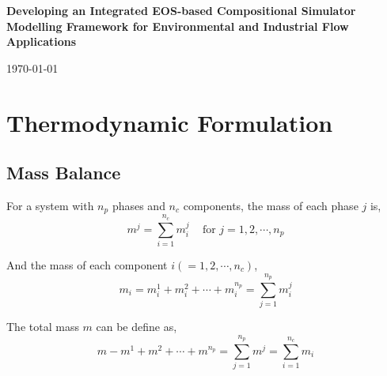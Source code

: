 \documentclass[12pts,a4paper,amsmath,amssymb,floatfix]{article}%
\newcommand{\summation}{\sum\limits}
\begin{document}
\begin{center}
{\Large {\bf Developing an Integrated EOS-based Compositional Simulator Modelling Framework for Environmental and Industrial Flow Applications}}
\end{center}
\begin{flushright}
\today
\end{flushright}

\section{Thermodynamic Formulation}
 
\subsection{Mass Balance}
For a system with $n_{p}$ phases and $n_{c}$ components, the mass of each phase $j$ is,
\begin{equation}
m^{j} = \summation_{i=1}^{n_{c}}m_{i}^{j}\;\;\;\text{ for }j=1,2,\cdots,n_{p}
\label{Eqn_MassBalance_Phase}
\end{equation}

And the mass of each component $i\left(=1,2,\cdots,n_{c}\right)$,
\begin{equation}
m_{i} = m_{i}^{1} + m_{i}^{2} + \cdots + m_{i}^{n_{p}} = \summation_{j=1}^{n_{p}}m_{i}^{j}
\label{Eqn_MassBalance_Component}
\end{equation}

The total mass $m$ can be define as,
\begin{equation}
m - m^{1} + m^{2} + \cdots + m^{n_{p}} = \summation_{j=1}^{n_{p}}m^{j} = \summation_{i=1}^{n_{c}}m_{i}
\label{Eqn_MassBalance_Mass}
\end{equation}
\end{document}
